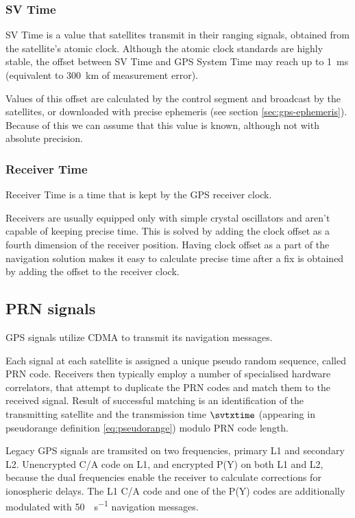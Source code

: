 \subsubsection{SV Time}
SV Time is a value that satellites transmit in their ranging signals,
obtained from the satellite's atomic clock.
Although the atomic clock standards are highly stable, the offset between SV
Time and GPS System Time may reach up to \SI{1}{\milli\second} (equivalent to
\SI{300}{\kilo\meter} of measurement error).

Values of this offset are calculated by the control segment
and broadcast by the satellites, or downloaded with precise ephemeris
(see section \ref{sec:gps-ephemeris}).
Because of this we can assume that this value is known, although not
with absolute precision.

\subsubsection{Receiver Time}
Receiver Time is a time that is kept by the GPS receiver clock.

Receivers are usually equipped only with simple crystal oscillators
and aren't capable of keeping precise time.
This is solved by adding the clock offset as a fourth dimension of the receiver position.
Having clock offset as a part of the navigation solution makes it easy to calculate
precise time after a fix is obtained by adding the offset to the receiver clock.

\subsection{PRN signals}
GPS signals utilize CDMA to transmit its navigation messages.

Each signal at each satellite is assigned a unique pseudo random sequence, called PRN
code.
Receivers then typically employ a number of specialised hardware correlators, 
that attempt to duplicate the PRN codes and match them to the received signal.
Result of successful matching is an identification of the transmitting satellite
and the transmission time \(\svtxtime\) (appearing in pseudorange definition \eqref{eq:pseudorange})
modulo PRN code length.

Legacy GPS signals are tramsited on two frequencies, primary L1 and secondary L2.
Unencrypted C/A code on L1, and encrypted P(Y) on both L1 and L2, because the dual
frequencies enable the receiver to calculate corrections for ionospheric delays.
The L1 C/A code and one of the P(Y) codes are additionally modulated with
\SI{50}{\bit\per\second} navigation messages.

